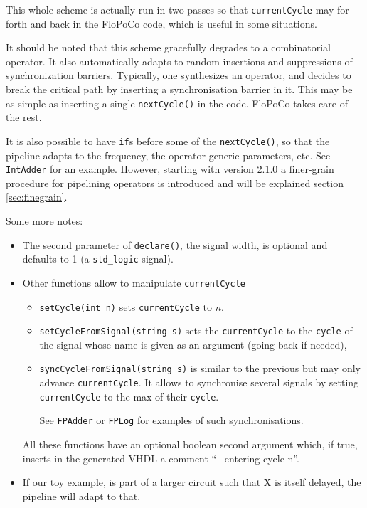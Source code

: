 \documentclass{article}
\begin{document}
This whole scheme is actually run in two passes so that
\verb!currentCycle! may for forth and back in the FloPoCo code, which is useful in some situations.

It should be noted that this scheme gracefully degrades to a
combinatorial operator. It also automatically adapts to random
insertions and suppressions of synchronization barriers. Typically,
one synthesizes an operator, and decides to break the critical path by
inserting a synchronisation barrier in it. This may be as simple as
inserting a single \verb!nextCycle()! in the code. FloPoCo takes care of the rest.

It is also possible to have \verb!if!s before some of the
\verb!nextCycle()!, so that the pipeline adapts to the frequency, the
operator generic parameters, etc. See \verb!IntAdder! for an example.
However, starting with version 2.1.0 a finer-grain procedure for pipelining 
operators is introduced and will be explained section \ref{sec:finegrain}.

Some more notes:
\begin{itemize}
\item The second parameter of \verb!declare()!, the signal width, is
  optional and defaults to 1 (a \verb!std_logic! signal).

\item Other functions allow to manipulate \verb!currentCycle!
  \begin{itemize}
  \item 
    \verb!setCycle(int n)! sets \verb!currentCycle! to  $n$.  
  \item \verb!setCycleFromSignal(string s)!  
    sets the \verb!currentCycle! to the \verb!cycle! of the signal
    whose name is given as an argument (going back if needed),
  \item 
    \verb!syncCycleFromSignal(string s)! is similar to the previous but may only advance
    \verb!currentCycle!. It allows to synchronise several
    signals by setting \verb!currentCycle! to the max of their
    \verb!cycle!.

See \verb!FPAdder! or \verb!FPLog! for examples of
  such synchronisations. 
  \end{itemize}

All these functions have an optional boolean
  second argument which, if true, inserts in the generated VHDL a
  comment ``-- entering cycle n''.


\item If our toy example, is part of a larger circuit such that X is
  itself delayed, the pipeline will adapt to that.

\end{itemize}
\end{document}
